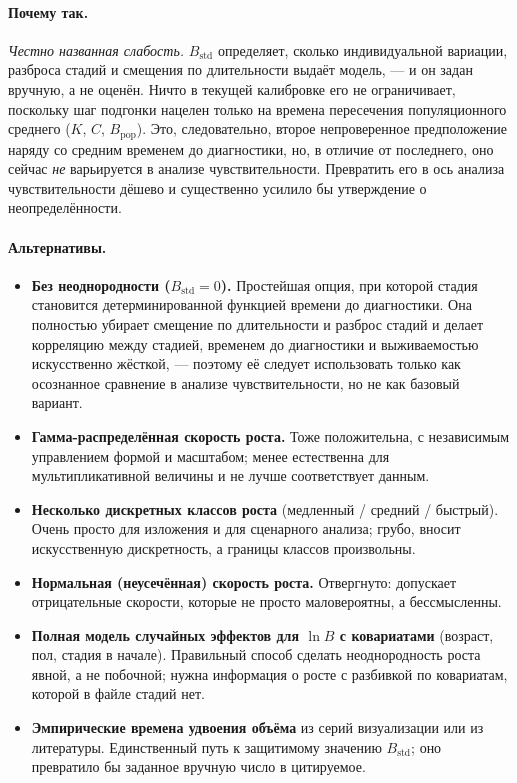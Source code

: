 \documentclass[12pt,a4paper]{article}
\newcommand{\why}[1]{\paragraph{Почему так.} #1}
\newcommand{\alt}[1]{\paragraph{Альтернативы.} #1}
\begin{document}
\why{\emph{Честно названная слабость.} $B_{\text{std}}$ определяет, сколько индивидуальной вариации,
разброса стадий и смещения по длительности выдаёт модель, --- и он задан вручную, а не оценён. Ничто в
текущей калибровке его не ограничивает, поскольку шаг подгонки нацелен только на времена пересечения
популяционного среднего ($K$, $C$, $B_{\text{pop}}$). Это, следовательно, второе непроверенное
предположение наряду со средним временем до диагностики, но, в отличие от последнего, оно сейчас
\emph{не} варьируется в анализе чувствительности. Превратить его в ось анализа чувствительности дёшево и
существенно усилило бы утверждение о неопределённости.}

\alt{\begin{itemize}[nosep]
  \item \textbf{Без неоднородности ($B_{\text{std}} = 0$).} Простейшая опция, при которой стадия становится
        детерминированной функцией времени до диагностики. Она полностью убирает смещение по длительности и
        разброс стадий и делает корреляцию между стадией, временем до диагностики и выживаемостью
        искусственно жёсткой, --- поэтому её следует использовать только как осознанное сравнение в анализе
        чувствительности, но не как базовый вариант.
  \item \textbf{Гамма-распределённая скорость роста.} Тоже положительна, с независимым управлением формой и
        масштабом; менее естественна для мультипликативной величины и не лучше соответствует данным.
  \item \textbf{Несколько дискретных классов роста} (медленный / средний / быстрый). Очень просто для
        изложения и для сценарного анализа; грубо, вносит искусственную дискретность, а границы классов
        произвольны.
  \item \textbf{Нормальная (неусечённая) скорость роста.} Отвергнуто: допускает отрицательные скорости,
        которые не просто маловероятны, а бессмысленны.
  \item \textbf{Полная модель случайных эффектов для $\ln B$ с ковариатами} (возраст, пол, стадия в начале).
        Правильный способ сделать неоднородность роста явной, а не побочной; нужна информация о росте с
        разбивкой по ковариатам, которой в файле стадий нет.
  \item \textbf{Эмпирические времена удвоения объёма} из серий визуализации или из литературы. Единственный
        путь к защитимому значению $B_{\text{std}}$; оно превратило бы заданное вручную число в цитируемое.
\end{itemize}}
\end{document}

